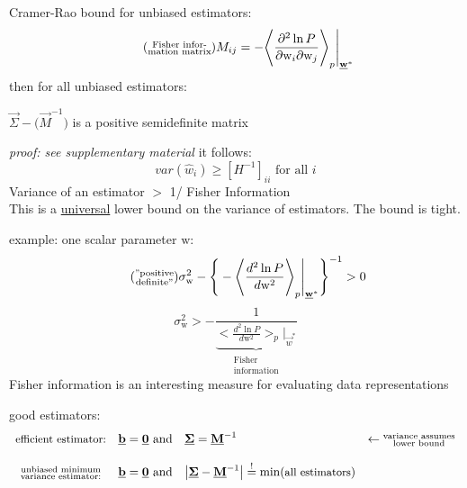 Cramer-Rao bound for unbiased estimators:
\begin{equation} \tag{$\substack{\text{Fisher infor-}\\ \text{mation matrix} }$}
        M_{ij} = -\Bigg< \frac{\partial^2 \ln P}{\partial \mathrm{w}_i
                        \partial \mathrm{w}_j} \Bigg>_p \Bigg|_{\vec{w}^*}
\end{equation}
then for all unbiased estimators: 
\begin{center}
$\vec{\Sigma} - \big(\vec{M}^{-1}\big)$ is a positive semidefinite matrix
\end{center}
{\it proof: see supplementary material}
it follows:
$$
var(\hat{w}_i) \geq [H^{-1}]_{ii} \text{ for all } i
$$
Variance of an estimator $>$ 1/ Fisher Information\\
\vspace{0.2cm}
This is a \underline{universal} lower bound on the variance of estimators. The bound is tight.
\begin{itemize}
        \itR example: one scalar parameter $\mathrm{w}$:
        \begin{equation} 
                \tag{$\substack{\text{''positive}\\\text{definite''}}$}
                \sigma_{\mathrm{w}}^2 - \Bigg\{ -\Bigg< 
                        \frac{d^2 \ln P}{d \mathrm{w}^2} \Bigg>_p \Bigg|_{
                                \vec{w}^*} \Bigg\}^{-1} > 0
        \end{equation}
        \begin{equation}
                \sigma_{\mathrm{w}}^2 > -\frac{1}{ 
                        \underbrace{ \Bigg< \frac{d^2 \ln P}{d 
                        \mathrm{w}^2} \Bigg>_p \Bigg|_{ \vec{w}^*} }_{
                                \substack{ \text{Fisher} \\
                                        \text{information}}}}
        \end{equation}
        \itR Fisher information is an interesting measure for evaluating data
                representations
\end{itemize}
good estimators:
\begin{equation}
        \begin{array}{ccll}
        \text{{\small efficient estimator:}} & \underline{\mathbf{b}} = \underline{\mathbf{0}} \text{ and} 
        & \underline{\mathbf{\Sigma}} = \underline{\mathbf{M}}^{-1} & \leftarrow \substack{ 
                        \text{variance assumes} \\ \text{lower bound}} \\\\
        \substack{ \text{unbiased minimum} \\ \text{variance estimator:}}
                & \underline{\mathbf{b}} = \underline{\mathbf{0}} \text{ and} & \big| \underline{\mathbf{\Sigma}} -
                        \underline{\mathbf{M}}^{-1} \big| \stackrel{\mathrm{!}}{=} \min(
                                \text{{\small all estimators}})
        \end{array}
\end{equation}
